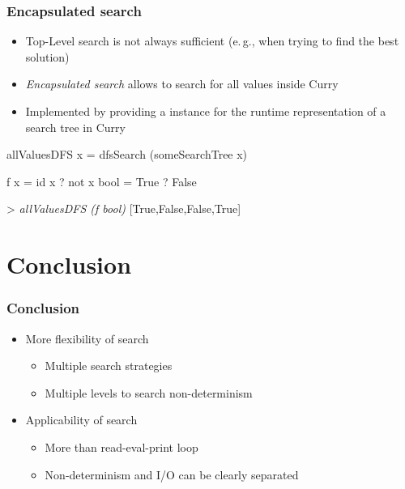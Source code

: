 \documentclass[
,hyperref={pdfpagelabels=false}
]{beamer}
\begin{document}


\begin{frame}[fragile]%
\frametitle{Encapsulated search}

\begin{itemize}
\item Top-Level search is not always sufficient (e.\,g., when trying to
      find the best solution)
\item \emph{Encapsulated search} allows to search for all values
      inside Curry
\item Implemented by providing a  instance for the runtime
      representation of a search tree in Curry
\end{itemize}

\pause

\begin{curry}
allValuesDFS x = dfsSearch (someSearchTree x)
\end{curry}

\begin{example}
\begin{program}
f x  = id x ? not x
bool = True ? False

> \textsl{allValuesDFS (f bool)}
[True,False,False,True]
\end{program}
\end{example}

\end{frame}


\section{Conclusion}

\begin{frame}[fragile]%
\frametitle{Conclusion}

\begin{itemize}
\item More flexibility of search
      \begin{itemize}
        \item Multiple search strategies
        \item Multiple levels to search non-determinism
      \end{itemize}
\item Applicability of search
      \begin{itemize}
        \item More than read-eval-print loop
        \item Non-determinism and I/O can be clearly separated
      \end{itemize}
\end{itemize}
\end{frame}
\end{document}

